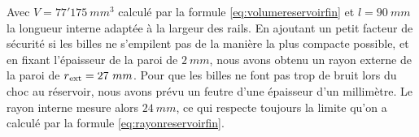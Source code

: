 Avec \(V=77'175\ mm^3\) calculé par la formule \ref{eq:volumereservoirfin} et \(l=90\ mm\) la longueur interne adaptée à la largeur des rails. En ajoutant un petit facteur de sécurité si les billes ne s'empilent pas de la manière la plus compacte possible, et en fixant l'épaisseur de la paroi de \(2\ mm \), nous avons obtenu un rayon externe de la paroi de \(r\textsubscript{ext}=27\ mm\). Pour que les billes ne font pas trop de bruit lors du choc au réservoir, nous avons prévu un feutre d'une épaisseur d'un millimètre. Le rayon interne mesure alors \(24\ mm \), ce qui respecte toujours la limite qu'on a calculé par la formule \ref{eq:rayonreservoirfin}.
